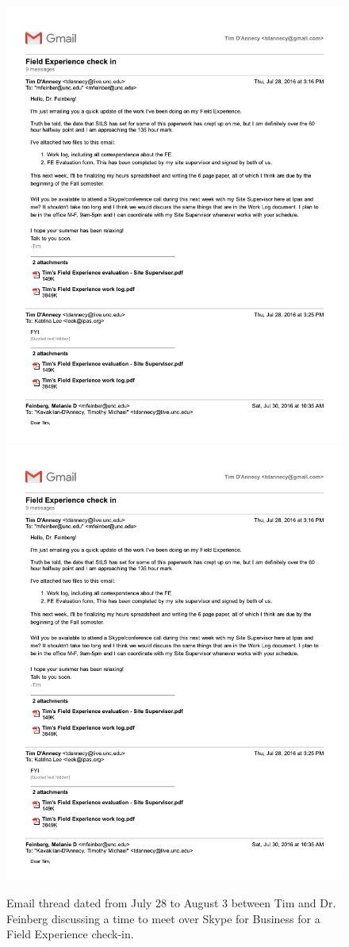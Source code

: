 \begin{figure}
   \centering
       \noindent\includegraphics[page=1,width=.45\textwidth]{documents/2016-08-03-Email-Tim-Melanie} \hfill 
       \noindent\includegraphics[page=2,width=.45\textwidth]{documents/2016-08-03-Email-Tim-Melanie} \hfill 
 \caption{Email thread dated from July 28 to August 3 between Tim and Dr. Feinberg discussing a time to meet over Skype for Business for a Field Experience check-in.}
 \label{fig:2016-08-03-Email-Tim-Melanie}
\end{figure}
